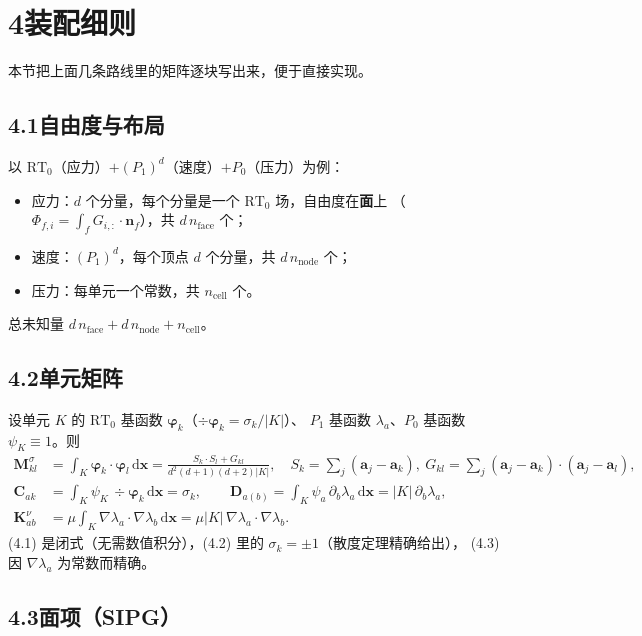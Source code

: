 \documentclass[UTF8,11pt,a4paper]{ctexart}
\theoremstyle{wjplain}
\theoremstyle{wjdef}
\newcommand{\dd}{\,\mathrm{d}}
\newcommand{\bn}{\boldsymbol n}
\newcommand{\bx}{\boldsymbol x}
\newcommand{\bK}{\boldsymbol K}
\newcommand{\ba}{\boldsymbol a}
\newcommand{\bC}{\boldsymbol C}
\newcommand{\bD}{\boldsymbol D}
\newcommand{\bM}{\boldsymbol M}
\newcommand{\bvarphi}{\boldsymbol\varphi}
\newcommand{\grad}{\nabla}
\newcommand{\RT}{\mathrm{RT}}
\begin{document}
\section{\texorpdfstring{4\quad 装配细则}{4 装配细则}}

本节把上面几条路线里的矩阵逐块写出来，便于直接实现。

\subsection*{4.1\quad 自由度与布局}

以 $\RT_0$（应力）$+ (P_1)^d$（速度）$+ P_0$（压力）为例：
\begin{itemize}
  \item 应力：$d$ 个分量，每个分量是一个 $\RT_0$ 场，自由度在\textbf{面}上
        （$\Phi_{f,i}=\int_f G_{i,:}\cdot\bn_f$），共 $d\,n_{\text{face}}$ 个；
  \item 速度：$(P_1)^d$，每个顶点 $d$ 个分量，共 $d\,n_{\text{node}}$ 个；
  \item 压力：每单元一个常数，共 $n_{\text{cell}}$ 个。
\end{itemize}
总未知量 $d\,n_{\text{face}}+d\,n_{\text{node}}+n_{\text{cell}}$。

\subsection*{4.2\quad 单元矩阵}

设单元 $K$ 的 $\RT_0$ 基函数 $\bvarphi_k$（$\div\bvarphi_k=\sigma_k/\lvert K\rvert$）、
$P_1$ 基函数 $\lambda_a$、$P_0$ 基函数 $\psi_K\equiv1$。则
\begin{align}
  \bM^\sigma_{kl}&=\int_K\bvarphi_k\cdot\bvarphi_l\dd\bx
   =\frac{S_k\cdot S_l+G_{kl}}{d^2(d+1)(d+2)\lvert K\rvert},
   \quad S_k=\sum_j(\ba_j-\ba_k),\ G_{kl}=\sum_j(\ba_j-\ba_k)\cdot(\ba_j-\ba_l),
   \tag{4.1}\\
  \bC_{ak}&=\int_K\psi_K\,\div\bvarphi_k\dd\bx=\sigma_k,\qquad
  \bD_{a(b)} = \int_K\psi_a\,\partial_b\lambda_a\dd\bx=\lvert K\rvert\,\partial_b\lambda_a,
   \tag{4.2}\\
  \bK^\nu_{ab}&=\mu\int_K\grad\lambda_a\cdot\grad\lambda_b\dd\bx
   =\mu\lvert K\rvert\,\grad\lambda_a\cdot\grad\lambda_b. \tag{4.3}
\end{align}
(4.1) 是闭式（无需数值积分），(4.2) 里的 $\sigma_k=\pm1$（散度定理精确给出），
(4.3) 因 $\grad\lambda_a$ 为常数而精确。

\subsection*{4.3\quad 面项（SIPG）}
\end{document}
